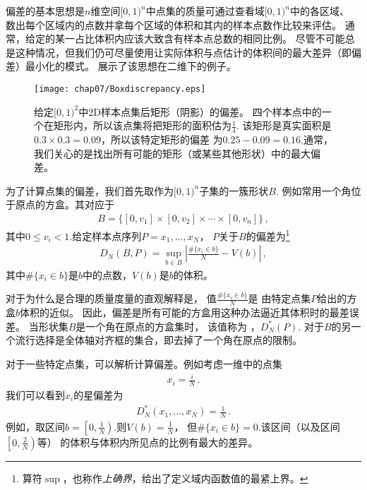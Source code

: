 偏差的基本思想是$n$维空间$[0,1)^n$中点集的质量可通过查看域$[0,1)^n$中的各区域、
数出每个区域内的点数并拿每个区域的体积和其内的样本点数作比较来评估。
通常，给定的某一占比体积内应该大致含有样本点总数的相同比例。
尽管不可能总是这种情况，但我们仍可尽量使用让实际体积与点估计的体积间的最大差异（即偏差）最小化的模式。
展示了该思想在二维下的例子。
\begin{figure}[htbp]
    \centering\texttt{[image: chap07/Boxdiscrepancy.eps]}
    \caption{给定$[0,1)^2$中2D样本点集后矩形（阴影）的偏差。
    四个样本点中的一个在矩形内，所以该点集将把矩形的面积估为$\frac{1}{4}$.
    该矩形是真实面积是$0.3\times0.3=0.09$，所以该特定矩形的偏差
    为$0.25-0.09=0.16$.通常，我们关心的是找出所有可能的矩形（或某些其他形状）中的最大偏差。}
    \label{fig:7.15}
\end{figure}

为了计算点集的偏差，我们首先取作为$[0,1)^n$子集的一簇形状$B$.
例如常用一个角位于原点的方盒。其对应于
\begin{align*}
    B=\{[0,v_1]\times[0,v_2]\times\cdots\times[0,v_n]\}\, ,
\end{align*}
其中$0\le v_i<1$.给定样本点序列$P=x_1,\ldots,x_N$，
$P$关于$B$的偏差为\footnote{算符$\sup$，也称作\emph{上确界}，给出了定义域内函数值的最紧上界。}
\begin{align}\label{eq:7.4}
    D_N(B,P)=\sup\limits_{b\in B}\left|\frac{\#\{x_i\in b\}}{N}-V(b)\right|\, ,
\end{align}
其中$\#\{x_i\in b\}$是$b$中的点数，$V(b)$是$b$的体积。

对于为什么是合理的质量度量的直观解释是，
值$\displaystyle\frac{\#\{x_i\in b\}}{N}$是
由特定点集$P$给出的方盒$b$体积的近似。
因此，偏差是所有可能的方盒用这种办法逼近其体积时的最差误差。
当形状集$B$是一个角在原点的方盒集时，
该值称为
，$D^*_N(P)$.
对于$B$的另一个流行选择是全体轴对齐框的集合，即去掉了一个角在原点的限制。

对于一些特定点集，可以解析计算偏差。例如考虑一维中的点集
\begin{align*}
    x_i=\frac{i}{N}\, .
\end{align*}
我们可以看到$x_i$的星偏差为
\begin{align*}
    D^*_N(x_1,\ldots,x_N)=\frac{1}{N}\, .
\end{align*}
例如，取区间$b=\displaystyle\left[0,\frac{1}{N}\right)$.则$V(b)=\displaystyle\frac{1}{N}$，
但$\#\{x_i\in b\}=0$.该区间（以及区间$\displaystyle\left[0,\frac{2}{N}\right)$等）
的体积与体积内所见点的比例有最大的差异。

